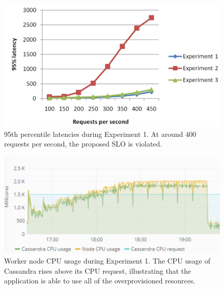 \begin{figure}
\centering
\includegraphics[width=0.90\columnwidth]{Images/Experiments/CPU/Latencies/lat-exp1-3.PNG}
\caption{95th percentile latencies during Experiment 1. At around 400 requests per second, the proposed SLO is violated.}
\label{fig:lat-cas-li} 
\end{figure}

\begin{figure}
\centering
\includegraphics[width=0.80\columnwidth]{Images/Experiments/CPU/Grafana/cpu-cas-li.PNG}
\caption{Worker node CPU usage during Experiment 1. The CPU usage of Cassandra rises above its CPU request, illustrating that the application is able to use all of the overprovisioned resources.}
\label{fig:cpu-cas-li} 
\end{figure}

%

